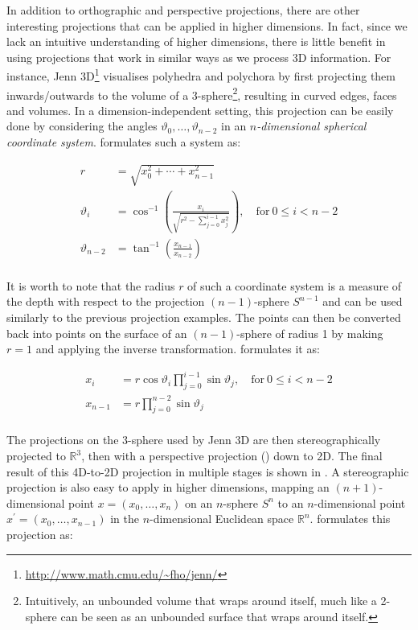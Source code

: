 In addition to orthographic and perspective projections, there are other interesting projections that can be applied in higher dimensions.
In fact, since we lack an intuitive understanding of higher dimensions, there is little benefit in using projections that work in similar ways as we process 3D information.
For instance, Jenn 3D\footnote{\url{http://www.math.cmu.edu/~fho/jenn/}} visualises polyhedra and polychora by first projecting them inwards/outwards to the volume of a 3-sphere\footnote{Intuitively, an unbounded volume that wraps around itself, much like a 2-sphere can be seen as an unbounded surface that wraps around itself.}, resulting in curved edges, faces and volumes.
In a dimension-independent setting, this projection can be easily done by considering the angles $\vartheta_0, \ldots, \vartheta_{n-2}$ in an \emph{$n$-dimensional spherical coordinate system}.
\citet[\S{}12.2]{Steeb11} formulates such a system as:

\begin{align*}
r &= \sqrt{x_0^2 + \cdots + x_{n-1}^2} \\
\vartheta_i &= \cos^{-1} \left( \frac{x_i}{\sqrt{r^2 - \sum_{j=0}^{i-1} x_j^2}} \right), \mathrm{\quad{}for\ } 0 \leq i < n-2 \\
\vartheta_{n-2} &= \tan^{-1} \left( \frac{x_{n-1}}{x_{n-2}} \right) \\
\end{align*}

It is worth to note that the radius $r$ of such a coordinate system is a measure of the depth with respect to the projection $(n-1)$-sphere $S^{n-1}$ and can be used similarly to the previous projection examples.
The points can then be converted back into points on the surface of an $(n-1)$-sphere of radius 1 by making $r = 1$ and applying the inverse transformation.
\citet[\S{}12.2]{Steeb11} formulates it as:

\begin{align*}
x_i &= r \cos \vartheta_i \prod_{j=0}^{i-1} \sin \vartheta_j, \mathrm{\quad{}for\ } 0 \leq i < n-2 \\
x_{n-1} &= r \prod_{j=0}^{n-2} \sin \vartheta_j \\
\end{align*}

The projections on the 3-sphere used by Jenn 3D are then stereographically projected to $\mathbb{R}^3$, then with a perspective projection () down to 2D.
The final result of this 4D-to-2D projection in multiple stages is shown in .
A stereographic projection is also easy to apply in higher dimensions, mapping an $(n+1)$-dimensional point $x = (x_0, \ldots, x_n)$ on an $n$-sphere $S^n$ to an $n$-dimensional point $x^\prime = (x_0, \ldots, x_{n-1})$ in the $n$-dimensional Euclidean space $\mathbb{R}^n$.
\citet{Chisholm00} formulates this projection as:


